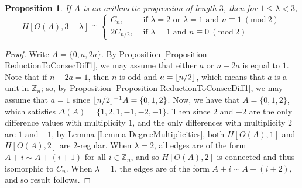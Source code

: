 \documentclass[12pt]{article}
\newcommand{\Z}{\mathbb{Z}}
\newcommand{\Mod}[1]{\ (\mathrm{mod}\ #1)}
\DeclarePairedDelimiter\floor{\lfloor}{\rfloor}
\newtheorem{prop}[thm]{Proposition}
\theoremstyle{definition}
\begin{document}
	\begin{prop}\label{Proposition-3APClassification}
		If $A$ is an arithmetic progression of length $3$, then for $1 \leq \lambda < 3$,
		$$H[O(A), 3-\lambda] \cong \begin{cases}
			C_n, &\text{ if $\lambda = 2$ or $\lambda = 1$ and $n \equiv 1 \Mod{2}$}	\\
			2C_{n/2}, &\text{ if $\lambda = 1$ and $n \equiv 0 \Mod{2}$}
		\end{cases}$$
	\end{prop}
	\begin{proof}
		Write $A = \{0, a, 2a\}$.  By Proposition \ref{Proposition-ReductionToConsecDiff1}, we may assume that either $a$ or $n-2a$ is equal to $1$.  Note that if $n-2a = 1$, then $n$ is odd and $a = \floor{n/2}$, which means that $a$ is a unit in $\Z_n$; so, by Proposition \ref{Proposition-ReductionToConsecDiff1}, we may assume that $a = 1$ since $\floor{n/2}^{-1}A = \{0,1,2\}$.  Now, we have that $A = \{0,1,2\}$, which satisfies $\Delta(A) = \{1, 2, 1, -1, -2, -1\}$.  Then since $2$ and $-2$ are the only difference values with multiplicity $1$, and the only differences with multiplicity $2$ are $1$ and $-1$, by Lemma \ref{Lemma-DegreeMultiplicities}, both $H[O(A), 1]$ and $H[O(A),2]$ are $2$-regular.  When $\lambda = 2$, all edges are of the form $A+i \sim A + (i+1)$ for all $i \in \Z_n$, and so $H[O(A), 2]$ is connected and thus isomorphic to $C_n$.  When $\lambda = 1$, the edges are of the form $A + i \sim A+(i+2)$, and so result follows. \qedhere
	\end{proof}
	
		
\end{document}
